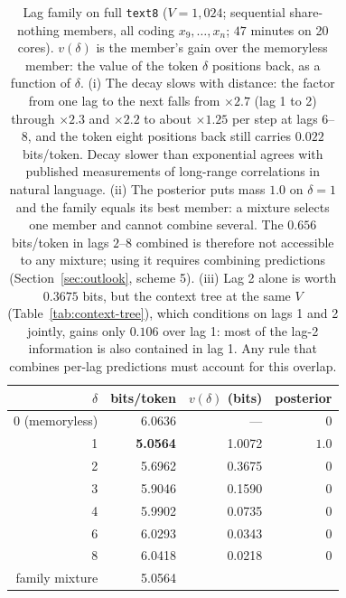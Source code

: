 \documentclass[11pt]{article}
\begin{document}
\begin{table}[ht]
\centering
\begin{tabular}{rrrr}
\toprule
$\delta$ & bits/token & $v(\delta)$ (bits) & posterior \\
\midrule
0 (memoryless) & 6.0636 & ---    & $0$ \\
1              & \textbf{5.0564} & 1.0072 & $1.0$ \\
2              & 5.6962 & 0.3675 & $0$ \\
3              & 5.9046 & 0.1590 & $0$ \\
4              & 5.9902 & 0.0735 & $0$ \\
6              & 6.0293 & 0.0343 & $0$ \\
8              & 6.0418 & 0.0218 & $0$ \\
\midrule
family mixture & 5.0564 & & \\
\bottomrule
\end{tabular}
\caption{Lag family on full \texttt{text8} ($V=1{,}024$; sequential
  share-nothing members, all coding $x_9,\dots,x_n$; $47$ minutes on
  20 cores).  $v(\delta)$ is the member's gain over the memoryless
  member: the value of the token $\delta$ positions back, as a function
  of $\delta$.  (i) The decay slows with distance: the factor from one
  lag to the next falls from $\times 2.7$ (lag 1 to 2) through
  $\times 2.3$ and $\times 2.2$ to about $\times 1.25$ per step at lags
  6--8, and the token eight positions back still carries $0.022$
  bits/token.  Decay slower than exponential agrees with published
  measurements of long-range correlations in natural language.
  (ii) The posterior puts mass $1.0$ on $\delta = 1$ and the family
  equals its best member: a mixture selects one member and cannot
  combine several.  The $0.656$ bits/token in lags $2$--$8$ combined is
  therefore not accessible to any mixture; using it requires combining
  predictions (Section~\ref{sec:outlook}, scheme 5).  (iii) Lag 2 alone
  is worth $0.3675$ bits, but the context tree at the same $V$
  (Table~\ref{tab:context-tree}), which conditions on lags 1 and 2
  jointly, gains only $0.106$ over lag 1: most of the lag-2 information
  is also contained in lag 1.  Any rule that combines per-lag
  predictions must account for this overlap.}
\label{tab:lag-family}
\end{table}
\end{document}
